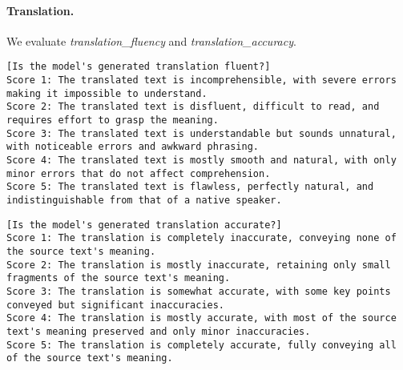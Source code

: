 \paragraph{Translation.} We evaluate \emph{translation\_fluency} and \emph{translation\_accuracy}.
\begin{lstlisting}[label=lst:judge_rubrics_trans1,caption={Rubric used for the \emph{translation\_fluency} criterion.}]
[Is the model's generated translation fluent?]
Score 1: The translated text is incomprehensible, with severe errors making it impossible to understand.
Score 2: The translated text is disfluent, difficult to read, and requires effort to grasp the meaning.
Score 3: The translated text is understandable but sounds unnatural, with noticeable errors and awkward phrasing.
Score 4: The translated text is mostly smooth and natural, with only minor errors that do not affect comprehension.
Score 5: The translated text is flawless, perfectly natural, and indistinguishable from that of a native speaker.
\end{lstlisting}
\begin{lstlisting}[label=lst:judge_rubrics_trans2,caption={Rubric used for the \emph{translation\_accuracy} criterion.}]
[Is the model's generated translation accurate?]
Score 1: The translation is completely inaccurate, conveying none of the source text's meaning.
Score 2: The translation is mostly inaccurate, retaining only small fragments of the source text's meaning.
Score 3: The translation is somewhat accurate, with some key points conveyed but significant inaccuracies.
Score 4: The translation is mostly accurate, with most of the source text's meaning preserved and only minor inaccuracies.
Score 5: The translation is completely accurate, fully conveying all of the source text's meaning.
\end{lstlisting}